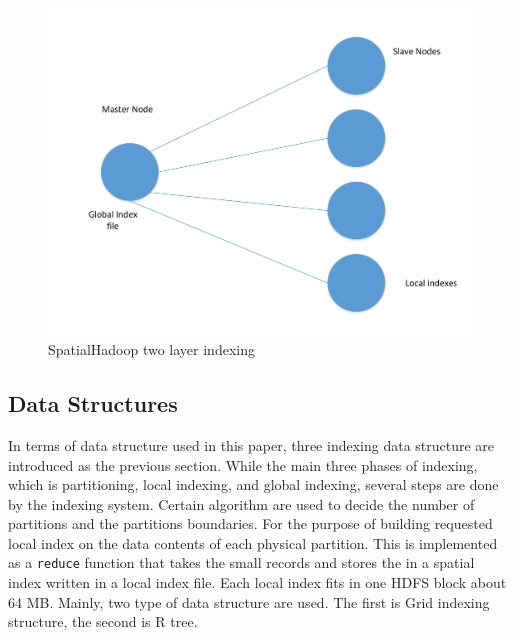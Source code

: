 \begin{figure}[htb!]
\centering
\includegraphics[width=0.90\columnwidth]{figures/Index.pdf}
\caption{SpatialHadoop two layer indexing}
\label{fig:index}
\end{figure}







\subsection{Data Structures}
\label{subsec:dataStructures}
In terms of data structure used in this paper, three indexing data structure are introduced as the previous section. While the main three phases of indexing, which is partitioning, local indexing, and global indexing, several steps are done by the indexing system. Certain algorithm are used to decide the number of partitions and the partitions boundaries. For the purpose of building requested local index on the data contents of each physical partition. This is implemented as a \texttt{reduce} function that takes the small records and stores the in a spatial index written in a local index file. Each local index fits in one HDFS block about 64 MB. Mainly, two type of data structure are used. The first is Grid indexing structure, the second is R tree. 

